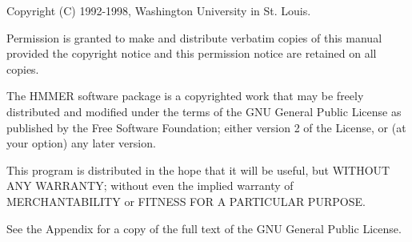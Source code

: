 \vspace*{\fill}
\begin{flushleft}
Copyright (C) 1992-1998, Washington University in St. Louis.\vspace{5mm}

Permission is granted to make and distribute verbatim copies of this
manual provided the copyright notice and this permission notice are
retained on all copies.\vspace{5mm}

The HMMER software package is a copyrighted work that may be freely
distributed and modified under the terms of the GNU General Public
License as published by the Free Software Foundation; either version 2
of the License, or (at your option) any later version.\vspace{5mm}

This program is distributed in the hope that it will be useful, but
WITHOUT ANY WARRANTY; without even the implied warranty of
MERCHANTABILITY or FITNESS FOR A PARTICULAR PURPOSE.\vspace{5mm}

See the Appendix for a copy of the full text of the GNU General Public
License.\vspace{5mm}

\end{flushleft}
